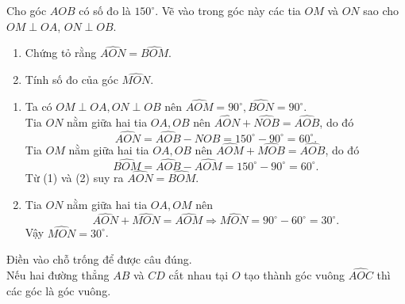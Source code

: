 \begin{vd}
Cho góc $ AOB $ có số đo là $ 150^\circ $. Vẽ vào trong góc này các tia $ OM $ và $ ON $ sao cho $ OM \perp OA $, $ ON \perp OB $.
\begin{enumerate}
	\item Chứng tỏ rằng $ \widehat{AON}=\widehat{BOM} $.
	\item Tính số đo của góc $ \widehat{MON} $.
\end{enumerate}	
	
	\loigiai
	{
		
	\begin{center}
		\end{center}	
		
\begin{enumerate}
	\item Ta có $ OM \perp OA, ON \perp OB $ nên $ \widehat{AOM}=90^\circ, \widehat{BON}=90^\circ $.\\
	Tia $ ON $ nằm giữa hai tia $ OA, OB $ nên $ \widehat{AON}+\widehat{NOB}=\widehat{AOB} $, do đó 
	\[ \widehat{AON}=\widehat{AOB}-\widehat{NOB}=150^\circ-90^\circ=60^\circ. \tag{1} \]
	Tia $ OM $ nằm giữa hai tia $ OA, OB $ nên $ \widehat{AOM}+\widehat{MOB}=\widehat{AOB} $, do đó 
	\[ \widehat{BOM}=\widehat{AOB}-\widehat{AOM}=150^\circ-90^\circ=60^\circ. \tag{2} \]
	Từ (1) và (2) suy ra $ \widehat{AON}=\widehat{BOM} $.
	\item Tia $ ON $ nằm giữa hai tia $ OA, OM $ nên 
	$$ \widehat{AON}+\widehat{MON}=\widehat{AOM} \Rightarrow \widehat{MON}=90^\circ-60^\circ=30^\circ. $$
	Vậy $ \widehat{MON}=30^\circ $.
\end{enumerate}		
	}
\end{vd}





\btvn

\begin{vn}
Điền vào chỗ trống để được câu đúng.\\
Nếu hai đường thẳng $ AB $ và $ CD $ cắt nhau tại $ O $ tạo thành góc vuông $ \widehat{AOC} $ thì các góc  là góc vuông.	
\end{vn}

